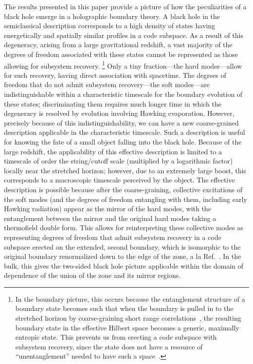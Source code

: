 \documentclass[12pt]{article}
\begin{document}
The results presented in this paper provide a picture of how the 
peculiarities of a black hole emerge in a holographic boundary 
theory.  A black hole in the semiclassical description corresponds 
to a high density of states having energetically and spatially 
similar profiles in a code subspace.  As a result of this degeneracy, 
arising from a large gravitational redshift, a vast majority of 
the degrees of freedom associated with these states cannot be 
represented as those allowing for subsystem recovery.%
\footnote{In the boundary picture, this occurs because the 
 entanglement structure of a boundary state becomes such that 
 when the boundary is pulled in to the stretched horizon by 
 coarse-graining short range correlations~\cite{Nomura:2018kji}, 
 the resulting boundary state in the effective Hilbert space 
 becomes a generic, maximally entropic state.  This prevents 
 us from erecting a code subspace with subsystem recovery, since 
 the state does not have a resource of ``unentanglement'' needed 
 to have such a space~\cite{Nomura:2017fyh}.}
Only a tiny fraction---the hard modes---allow for such recovery, 
having direct association with spacetime.  The degrees of freedom 
that do not admit subsystem recovery---the soft modes---are 
indistinguishable within a characteristic timescale for the 
boundary evolution of these states; discriminating them requires 
much longer time in which the degeneracy is resolved by evolution 
involving Hawking evaporation.  However, precisely because of 
this indistinguishability, we can have a new coarse-grained 
description applicable in the characteristic timescale.  Such 
a description is useful for knowing the fate of a small object 
falling into the black hole.  Because of the large redshift, 
the applicability of this effective description is limited to 
a timescale of order the string/cutoff scale (multiplied by a 
logarithmic factor) locally near the stretched horizon; however, 
due to an extremely large boost, this corresponds to a macroscopic 
timescale perceived by the object.  The effective description 
is possible because after the coarse-graining, collective 
excitations of the soft modes (and the degrees of freedom 
entangling with them, including early Hawking radiation) appear 
as the mirror of the hard modes, with the entanglement between 
the mirror and the original hard modes taking a thermofield 
double form.  This allows for reinterpreting these collective 
modes as representing degrees of freedom that admit subsystem 
recovery in a code subspace erected on the extended, second 
boundary, which is isomorphic to the original boundary renormalized 
down to the edge of the zone, a la Ref.~\cite{Nomura:2018kji}. 
In the bulk, this gives the two-sided black hole picture applicable 
within the domain of dependence of the union of the zone and 
its mirror regions.
\end{document}
